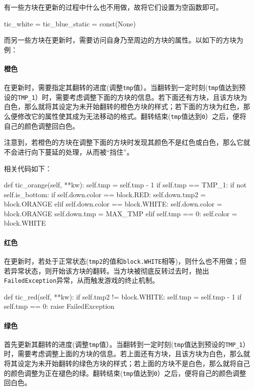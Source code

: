 \documentclass[UTF8]{article}
\begin{document}
有一些方块在更新的过程中什么也不用做，故将它们设置为空函数即可。
\begin{python}
tic_white = tic_blue_static = const(None)
\end{python}

而另一些方块在更新时，需要访问自身乃至周边的方块的属性。以如下的方块为例：

\paragraph{橙色}在更新时，需要指定其翻转的进度(调整\texttt{tmp}值）。当翻转到一定时刻(\texttt{tmp}值达到预设的\verb|TMP_1|）时，需要考虑调整下面的方块的信息。若下面还有方块，且该方块为白色，那么就将其设定为未开始翻转的橙色方块的样式；若下面的方块为红色，那么便修改它的属性使其成为无法移动的格式。翻转结束(\texttt{tmp}值达到\texttt{0}）之后，便将自己的颜色调整回白色。

注意到，若橙色的方块在调整下面的方块时发现其颜色不是红色或白色，那么它就不会进行向下蔓延的处理，从而被“挡住”。

相关代码如下：
\begin{python}
def tic_orange(self, **kw):
    self.tmp = self.tmp - 1
    if self.tmp == TMP_1:
        if not self.is_bottom:
            if self.down.color == block.RED:
                self.down.tmp2 = block.ORANGE
            elif self.down.color == block.WHITE:
                self.down.color = block.ORANGE
                self.down.tmp   = MAX_TMP
    elif self.tmp == 0:
        self.color = block.WHITE
\end{python}

\paragraph{红色} 在更新时，若处于正常状态(\texttt{tmp2}的值和\texttt{block.WHITE}相等)，则什么也不用做；但若异常状态，则开始该方块的翻转。当方块被彻底反转过去时，抛出\texttt{FailedException}异常，从而触发游戏的终止机制。

\begin{python}
def tic_red(self, **kw):
    if self.tmp2 != block.WHITE:
        self.tmp = self.tmp - 1
        if self.tmp == 0:
            raise FailedException
\end{python}

\paragraph{绿色} 首先更新其翻转的进度(调整\texttt{tmp}值）。当翻转到一定时刻(\texttt{tmp}值达到预设的\verb|TMP_1|）时，需要考虑调整上面的方块的信息。若上面还有方块，且该方块为白色，那么就将其设定为未开始翻转的绿色方块的样式；若上面的方块不是白色，那么就将自己的颜色调整为正在褪色的绿。翻转结束(\texttt{tmp}值达到\texttt{0}）之后，便将自己的颜色调整回白色。
\end{document}

